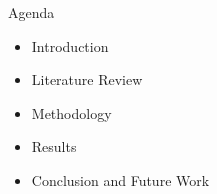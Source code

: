 
\titulo{\textbf{\thetitle}}
\autores{\theauthor}
\capa


\begin{frame}{Agenda}
\begin{itemize}
    \item Introduction \pause
    \item Literature Review \pause
    \item Methodology \pause
    \item Results \pause
    \item Conclusion and Future Work
\end{itemize}
\end{frame}